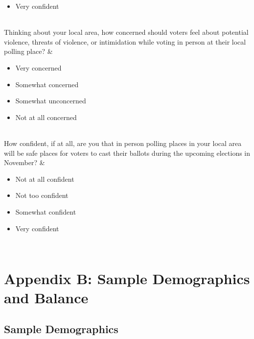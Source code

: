 \documentclass[
  12pt,
  letterpaper,
]{article}
\begin{document}
\begin{table}
{\begin{tblr}[         %
]
\begin{itemize}
\item Very confident

\end{itemize}\endminipage \\
Thinking about your local area, how concerned should voters feel about potential violence, threats of violence, or intimidation while voting in person at their local polling place? & \minipage{\textwidth}\begin{itemize}
\item Very concerned

\item Somewhat concerned

\item Somewhat unconcerned

\item Not at all concerned

\end{itemize}\endminipage \\
How confident, if at all, are you that in person polling places in your local area will be safe places for voters to cast their ballots during the upcoming elections in November? & \minipage{\textwidth}\begin{itemize}
\item Not at all confident

\item Not too confident

\item Somewhat confident

\item Very confident

\end{itemize}\endminipage \\
\bottomrule
\end{tblr}

}

\end{table}%

\newpage

\section{Appendix B: Sample Demographics and
Balance}\label{appendix-b-sample-demographics-and-balance}

\subsection{Sample Demographics}\label{sample-demographics}
\end{document}
